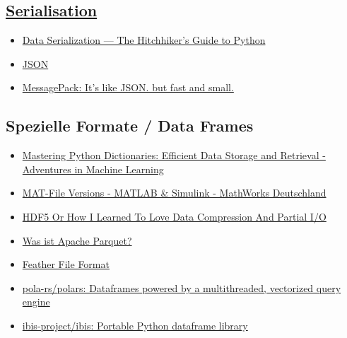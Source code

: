 \documentclass[
  ngerman,
  letterpaper,
]{scrbook}
\providecommand{\tightlist}{%
  \setlength{\itemsep}{0pt}\setlength{\parskip}{0pt}}
\begin{document}
\subsection{\texorpdfstring{\href{https://en.wikipedia.org/wiki/Serialization}{Serialisation}}{Serialisation}}\label{serialisation}

\begin{itemize}
\tightlist
\item
  \href{https://docs.python-guide.org/scenarios/serialization/}{Data
  Serialization --- The Hitchhiker's Guide to Python}
\item
  \href{https://www.json.org/json-en.html}{JSON}
\item
  \href{https://msgpack.org/}{MessagePack: It's like JSON. but fast and
  small.}
\end{itemize}

\subsection{Spezielle Formate / Data
Frames}\label{spezielle-formate-data-frames}

\begin{itemize}
\tightlist
\item
  \href{https://www.adventuresinmachinelearning.com/mastering-python-dictionaries-efficient-data-storage-and-retrieval/}{Mastering
  Python Dictionaries: Efficient Data Storage and Retrieval - Adventures
  in Machine Learning}
\item
  \href{https://de.mathworks.com/help/matlab/import_export/mat-file-versions.html}{MAT-File
  Versions - MATLAB \& Simulink - MathWorks Deutschland}
\item
  \href{https://www.hdfgroup.org/2018/06/15/hdf5-or-how-i-learned-to-love-data-compression-and-partial-i-o/}{HDF5
  Or How I Learned To Love Data Compression And Partial I/O}
\item
  \href{https://www.databricks.com/de/glossary/what-is-parquet}{Was ist
  Apache Parquet?}
\item
  \href{https://arrow.apache.org/docs/python/feather.html}{Feather File
  Format}
\item
  \href{https://github.com/pola-rs/polars}{pola-rs/polars: Dataframes
  powered by a multithreaded, vectorized query engine}
\item
  \href{https://github.com/ibis-project/ibis}{ibis-project/ibis:
  Portable Python dataframe library}
\end{itemize}
\end{document}
